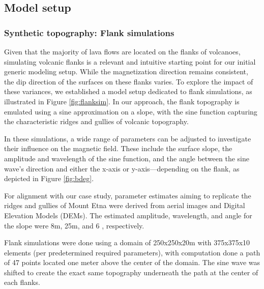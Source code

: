 


\subsection{Model setup}

\subsubsection{Synthetic topography: Flank simulations}
Given that the majority of lava flows are located on the flanks of volcanoes, simulating volcanic flanks is a relevant and intuitive starting point for our initial generic modeling setup. While the magnetization direction remains consistent, the dip direction of the surfaces on these flanks varies. To explore the impact of these variances, we established a model setup dedicated to flank simulations, as illustrated in Figure \ref{fig:flanksim}. In our approach, the flank topography is emulated using a sine approximation on a slope, with the sine function capturing the characteristic ridges and gullies of volcanic topography.

In these simulations, a wide range of parameters can be adjusted to investigate their influence on the magnetic field. These include the surface slope, the amplitude and wavelength of the sine function, and the angle between the sine wave's direction and either the x-axis or y-axis—depending on the flank, as depicted in Figure \ref{fig:bdeg}.

For alignment with our case study, parameter estimates aiming to replicate the ridges and gullies of Mount Etna were derived from aerial images and Digital Elevation Models (DEMs). The estimated amplitude, wavelength, and angle for the slope were 8m, 25m, and 6 \degree, respectively. 

Flank simulations were done using a domain of 250x250x20m with 375x375x10 elements (per predetermined required parameters), with computation done a path of 47 points located one meter above the center of the domain. The sine wave was shifted to create the exact same topography underneath the path at the center of each flanks.

